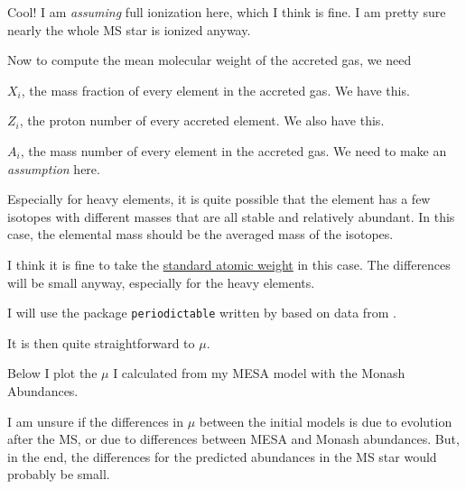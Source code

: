 \documentclass[a4paper,10pt]{article}
\begin{document}
Cool! I am \emph{assuming} full ionization here, which I think is fine. I am pretty sure nearly
the whole MS star is ionized anyway.

Now to compute the mean molecular weight of the accreted gas, we need
\begin{citemize}
    \item  \(X_{i}\), the mass fraction of every element in the accreted gas. We have this.
    \item  \(Z_{i}\), the proton number of every accreted element. We also have this.
    \item  \(A_{i}\), the mass number of every element in the accreted gas. We need to make an
        \emph{assumption} here.
\end{citemize}
Especially for heavy elements, it is quite possible that the element has a few isotopes with
different masses that are all stable and relatively abundant. In this case, the elemental mass
should be the averaged mass of the isotopes.

I think it is fine to take the \href{https://en.wikipedia.org/wiki/Standard_atomic_weight}
{standard atomic weight} in this case. The differences
will be small anyway, especially for the heavy elements.

I will use the package \lstinline[style=output, breaklines=true]|periodictable| written by \citet{kienzle2026} based on data from \citet{meija2013}.

It is then quite straightforward to \(\mu\).

Below I plot the \(\mu\) I calculated from my MESA model with the Monash Abundances.
\begin{figure}[ht]
    \centering
\end{figure}

I am unsure if the differences in \(\mu\) between the initial models is due to evolution after
the MS, or due to differences between MESA and Monash abundances. But,
in the end, the differences for the predicted abundances in the MS star would probably be small.
\end{document}
